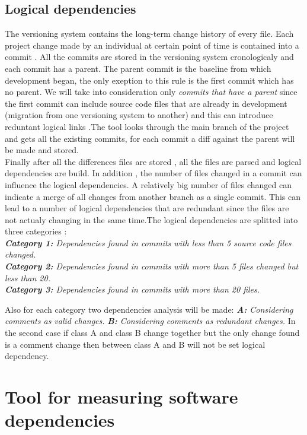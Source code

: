 \documentclass[12pt,a4paper,oneside]{report}
\begin{document}
\section{Logical dependencies}
The versioning system contains the long-term change history of every file. Each project change made by an individual at certain point of time is contained into a commit \cite{ct7}. All the commits are stored in the versioning system cronologicaly and each commit has a parent. The parent commit is the baseline from which development began, the only exeption to this rule is the first commit which has no parent. We will take into consideration only \textit{commits that have a parent} since the first commit can include source code files that are already in development (migration from one versioning system to another) and this can introduce reduntant logical links \cite{ct8} .The tool looks through the main branch of the project and gets all the existing commits, for each commit a diff against the parent will be made and stored.\\ Finally after all the differences files are stored , all the files are parsed and logical dependencies are build. In addition , the number of files changed in a commit can influence the logical dependencies. A relatively big number of files changed can indicate a merge of all changes from another branch as a single commit. This can lead to a number of logical dependencies that are redundant since the files are not actualy changing in the same time.The logical dependencies are splitted into three categories :\\
\textit{\textbf{Category 1:} Dependencies found in commits with less than 5 source code files changed.}\\
\textit{\textbf{Category 2:} Dependencies found in commits with more than 5 files changed but less than 20. }\\
\textit{\textbf{Category 3:} Dependencies found in commits with more than 20 files.}

Also for each category two dependencies analysis will be made:
\textit{\textbf{A:} Considering comments  as valid changes.}
\textit{\textbf{B:} Considering comments  as redundant changes. }
In the second case if class A and class B change together but the only change found is a comment change then between class A and B will not be set logical dependency.

\chapter{Tool for measuring software dependencies}
\end{document}

